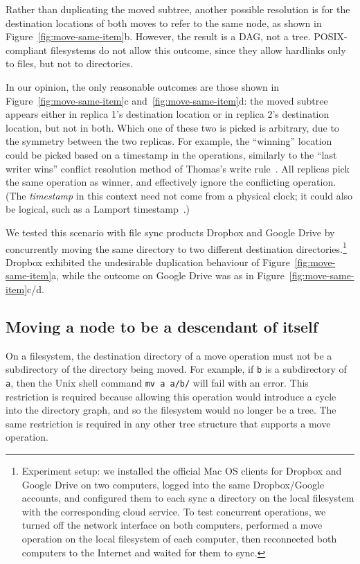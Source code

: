 \documentclass[sigplan,anonymous]{acmart}
\begin{document}
Rather than duplicating the moved subtree, another possible resolution is for the destination locations of both moves to refer to the same node, as shown in Figure~\ref{fig:move-same-item}b.
However, the result is a DAG, not a tree.
POSIX-compliant filesystems do not allow this outcome, since they allow hardlinks only to files, but not to directories.

In our opinion, the only reasonable outcomes are those shown in Figure~\ref{fig:move-same-item}c and~\ref{fig:move-same-item}d: the moved subtree appears either in replica 1's destination location or in replica 2's destination location, but not in both.
Which one of these two is picked is arbitrary, due to the symmetry between the two replicas.
For example, the ``winning'' location could be picked based on a timestamp in the operations, similarly to the ``last writer wins'' conflict resolution method of Thomas's write rule~\cite{Johnson:1975we}.
All replicas pick the same operation as winner, and effectively ignore the conflicting operation.
(The \emph{timestamp} in this context need not come from a physical clock; it could also be logical, such as a Lamport timestamp~\cite{Lamport:1978jq}.)

We tested this scenario with file sync products Dropbox and Google Drive by concurrently moving the same directory to two different destination directories.\footnote{Experiment setup: we installed the official Mac OS clients for Dropbox and Google Drive on two computers, logged into the same Dropbox/Google accounts, and configured them to each sync a directory on the local filesystem with the corresponding cloud service.
To test concurrent operations, we turned off the network interface on both computers, performed a move operation on the local filesystem of each computer, then reconnected both computers to the Internet and waited for them to sync.}
Dropbox exhibited the undesirable duplication behaviour of Figure~\ref{fig:move-same-item}a, while the outcome on Google Drive was as in Figure~\ref{fig:move-same-item}c/d.

\subsection{Moving a node to be a descendant of itself}\label{sec:move-cycle}

On a filesystem, the destination directory of a move operation must not be a subdirectory of the directory being moved.
For example, if \texttt{b} is a subdirectory of \texttt{a}, then the Unix shell command \texttt{mv a a/b/} will fail with an error.
This restriction is required because allowing this operation would introduce a cycle into the directory graph, and so the filesystem would no longer be a tree.
The same restriction is required in any other tree structure that supports a move operation.
\end{document}
